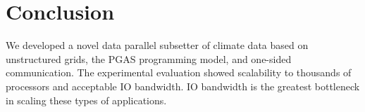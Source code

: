 \section{Conclusion}
\label{section:conclusion}

We developed a novel data parallel subsetter of climate data based on
unstructured grids, the PGAS programming model, and one-sided communication.
The experimental evaluation showed scalability to thousands of processors and
acceptable IO bandwidth.  IO bandwidth is the greatest bottleneck in scaling
these types of applications.
